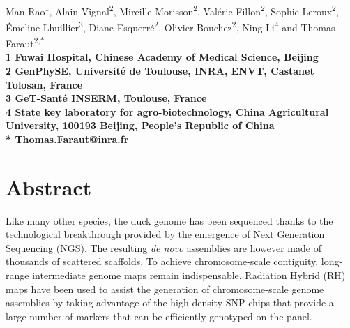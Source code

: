 \documentclass[10pt,letterpaper]{article}
\begin{document}
\vspace*{0.35in}

\begin{flushleft}
{\Large
\textbf{}
}
\newline
\\
Man Rao\textsuperscript{1},
Alain Vignal\textsuperscript{2},
Mireille Morisson\textsuperscript{2},
Valérie Fillon\textsuperscript{2},
Sophie Leroux\textsuperscript{2},
\'Emeline Lhuillier\textsuperscript{3},
Diane Esquerré\textsuperscript{2},
Olivier Bouchez\textsuperscript{2},
Ning Li\textsuperscript{4} and
Thomas Faraut\textsuperscript{2,*}
\\
\bigskip
\bf{1} Fuwai Hospital, Chinese Academy of Medical Science, Beijing \\ %
\bf{2} GenPhySE, Université de Toulouse, INRA, ENVT, Castanet Tolosan, France\\ %
\bf{3} GeT-Santé INSERM, Toulouse, France \\ %
\bf{4} State key laboratory for agro-biotechnology, China Agricultural University,  100193 Beijing, People's Republic of China
\\
\bigskip
* Thomas.Faraut@inra.fr

\end{flushleft}

\section*{Abstract}
Like many other species, the duck genome has been sequenced thanks to the technological breakthrough provided by the emergence of Next Generation Sequencing (NGS). 
The resulting {\em de novo} assemblies are however made of thousands of scattered scaffolds. 
To achieve chromosome-scale contiguity, long-range intermediate genome maps remain indispensable. Radiation Hybrid (RH) maps have been used to assist the generation of chromosome-scale genome assemblies by taking advantage of the high density SNP chips that provide a large number of markers that can be efficiently genotyped on the panel.
\end{document}
